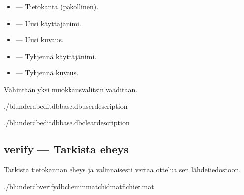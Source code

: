 \documentclass[letterpaper,10pt,finnish]{sphinxmanual}
\begin{document}
\sphinxAtStartPar
{}
\begin{itemize}
\item {} 
\sphinxAtStartPar
{} — Tietokanta (pakollinen).

\item {} 
\sphinxAtStartPar
{} — Uusi käyttäjänimi.

\item {} 
\sphinxAtStartPar
{} — Uusi kuvaus.

\item {} 
\sphinxAtStartPar
{} — Tyhjennä käyttäjänimi.

\item {} 
\sphinxAtStartPar
{} — Tyhjennä kuvaus.

\end{itemize}

\sphinxAtStartPar
Vähintään yksi muokkausvalitsin vaaditaan.

\sphinxAtStartPar
{}

\begin{sphinxVerbatim}[commandchars=\\\{\}]
./blunderdbedit\PYGZhy{}\PYGZhy{}dbbase.db\PYGZhy{}\PYGZhy{}user\PYGZhy{}\PYGZhy{}description

./blunderdbedit\PYGZhy{}\PYGZhy{}dbbase.db\PYGZhy{}\PYGZhy{}clear\PYGZhy{}description
\end{sphinxVerbatim}


\subsection{verify — Tarkista eheys}
\label{\detokenize{cli:verify-verifier-l-integrite}}
\sphinxAtStartPar
Tarkista tietokannan eheys ja valinnaisesti vertaa ottelua sen lähdetiedostoon.

\begin{sphinxVerbatim}[commandchars=\\\{\}]
./blunderdbverify\PYGZhy{}\PYGZhy{}db\PYGZlt{}chemin\PYGZgt{}\PYG{o}{[}\PYGZhy{}\PYGZhy{}match\PYGZlt{}id\PYGZgt{}\PYG{o}{]}\PYG{o}{[}\PYGZhy{}\PYGZhy{}mat\PYGZlt{}fichier.mat\PYGZgt{}\PYG{o}{]}
\end{sphinxVerbatim}
\end{document}
